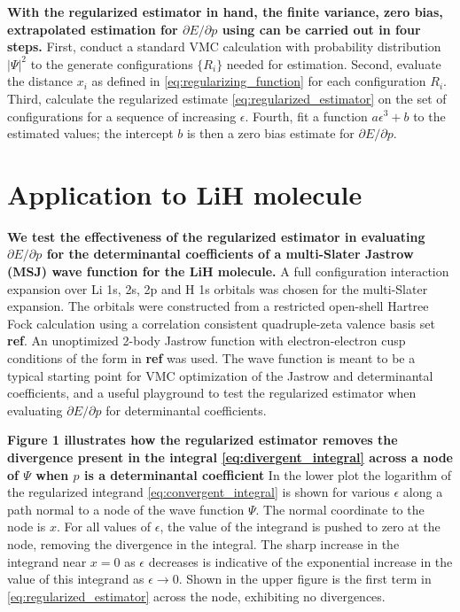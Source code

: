 \documentclass{article}
\begin{document}
\textbf{With the regularized estimator in hand, the finite variance, zero bias, extrapolated estimation for $\partial E/\partial p$ using can be carried out in four steps.}
First, conduct a standard VMC calculation with probability distribution $|\Psi|^2$ to the generate configurations $\{R_i\}$ needed for estimation.
Second, evaluate the distance $x_i$ as defined in \eqref{eq:regularizing_function} for each configuration $R_i$.
Third, calculate the regularized estimate \eqref{eq:regularized_estimator} on the set of configurations for a sequence of increasing $\epsilon$.
Fourth, fit a function $a\epsilon^3 + b$ to the estimated values; the intercept $b$ is then a zero bias estimate for $\partial E/\partial p.$

\section{Application to LiH molecule}
\textbf{We test the effectiveness of the regularized estimator in evaluating $\partial E/\partial p$ for the determinantal coefficients of a multi-Slater Jastrow (MSJ) wave function for the LiH molecule.}
A full configuration interaction expansion over Li 1s, 2s, 2p and H 1s orbitals was chosen for the multi-Slater expansion.
The orbitals were constructed from a restricted open-shell Hartree Fock calculation using a correlation consistent quadruple-zeta valence basis set \textbf{ref}.
An unoptimized 2-body Jastrow function with electron-electron cusp conditions of the form in \textbf{ref} was used.
The wave function is meant to be a typical starting point for VMC optimization of the Jastrow and determinantal coefficients, and a useful playground to test the regularized estimator when evaluating $\partial E/\partial p$ for determinantal coefficients.

\textbf{Figure 1 illustrates how the regularized estimator removes the divergence present in the integral \eqref{eq:divergent_integral} across a node of $\Psi$ when $p$ is a determinantal coefficient }
In the lower plot the logarithm of the regularized integrand \eqref{eq:convergent_integral} is shown for various $\epsilon$ along a path normal to a node of the wave function $\Psi$.
The normal coordinate to the node is $x$.
For all values of $\epsilon$, the value of the integrand is pushed to zero at the node, removing the divergence in the integral.
The sharp increase in the integrand near $x=0$ as $\epsilon$ decreases is indicative of the exponential increase in the value of this integrand as $\epsilon \rightarrow 0$.
Shown in the upper figure is the first term in \eqref{eq:regularized_estimator} across the node, exhibiting no divergences.
\end{document}
